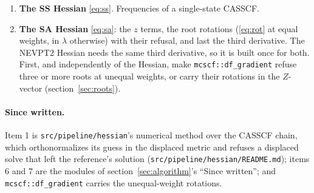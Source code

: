 \documentclass[11pt]{article}
\newcommand{\code}[1]{\texttt{#1}}
\begin{document}
\begin{enumerate}
        against the unreduced coupled PCG before choosing.
  \item \textbf{The SS Hessian} \eqref{eq:ss}. Frequencies of a
        single-state CASSCF.
  \item \textbf{The SA Hessian} \eqref{eq:sa}: the $z$ terms, the root
        rotations (\eqref{eq:rot} at equal weights, in $\lambda$ otherwise)
        with their refusal, and last the third derivative. The NEVPT2
        Hessian needs the same third derivative, so it is built once for
        both. First, and independently of the Hessian, make
        \code{mcscf::df\_gradient} refuse three or more roots at unequal
        weights, or carry their rotations in the $Z$-vector
        (section~\ref{sec:roots}).
\end{enumerate}

\paragraph{Since written.} Item 1 is \code{src/pipeline/hessian}'s
numerical method over the CASSCF chain, which orthonormalizes its guess in the
displaced metric and refuses a displaced solve that left the reference's
solution (\code{src/pipeline/hessian/README.md});
items 6 and 7 are the modules of section~\ref{sec:algorithm}'s ``Since
written''; and \code{mcscf::df\_gradient} carries the unequal-weight
rotations.

\end{document}
